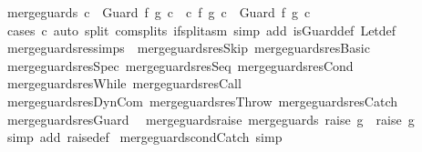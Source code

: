 \begin{isabellebody}
\ {\isachardoublequoteopen}merge{\isacharunderscore}guards\ c\ {\isacharequal}\ Guard\ f\ g\ c{\isacharprime}\ {\isasymLongrightarrow}\ {\isasymexists}c{\isacharprime}{\isacharprime}\ f{\isacharprime}\ g{\isacharprime}{\isachardot}\ c\ {\isacharequal}\ Guard\ f{\isacharprime}\ g{\isacharprime}\ c{\isacharprime}{\isacharprime}{\isachardoublequoteclose}\isanewline
%
\isadelimproof
\ \ %
\endisadelimproof
%
\isatagproof
{}\isamarkupfalse%
\ {\isacharparenleft}cases\ c{\isacharparenright}\ {\isacharparenleft}auto\ split{\isacharcolon}\ com{\isachardot}splits\ if{\isacharunderscore}split{\isacharunderscore}asm\ simp\ add{\isacharcolon}\ is{\isacharunderscore}Guard{\isacharunderscore}def\ Let{\isacharunderscore}def{\isacharparenright}%
\endisatagproof
{\isafoldproof}%
%
\isadelimproof
\isanewline
%
\endisadelimproof
\isanewline
{}\isamarkupfalse%
\ merge{\isacharunderscore}guards{\isacharunderscore}res{\isacharunderscore}simps\ {\isacharequal}\ merge{\isacharunderscore}guards{\isacharunderscore}res{\isacharunderscore}Skip\ merge{\isacharunderscore}guards{\isacharunderscore}res{\isacharunderscore}Basic\ \isanewline
\ merge{\isacharunderscore}guards{\isacharunderscore}res{\isacharunderscore}Spec\ merge{\isacharunderscore}guards{\isacharunderscore}res{\isacharunderscore}Seq\ merge{\isacharunderscore}guards{\isacharunderscore}res{\isacharunderscore}Cond\ \isanewline
\ merge{\isacharunderscore}guards{\isacharunderscore}res{\isacharunderscore}While\ merge{\isacharunderscore}guards{\isacharunderscore}res{\isacharunderscore}Call\isanewline
\ merge{\isacharunderscore}guards{\isacharunderscore}res{\isacharunderscore}DynCom\ merge{\isacharunderscore}guards{\isacharunderscore}res{\isacharunderscore}Throw\ merge{\isacharunderscore}guards{\isacharunderscore}res{\isacharunderscore}Catch\ \isanewline
\ merge{\isacharunderscore}guards{\isacharunderscore}res{\isacharunderscore}Guard\ \isanewline
\isanewline
{}\isamarkupfalse%
\ merge{\isacharunderscore}guards{\isacharunderscore}raise{\isacharcolon}\ {\isachardoublequoteopen}merge{\isacharunderscore}guards\ {\isacharparenleft}raise\ g{\isacharparenright}\ {\isacharequal}\ raise\ g{\isachardoublequoteclose}\isanewline
%
\isadelimproof
\ \ %
\endisadelimproof
%
\isatagproof
{}\isamarkupfalse%
\ {\isacharparenleft}simp\ add{\isacharcolon}\ raise{\isacharunderscore}def{\isacharparenright}%
\endisatagproof
{\isafoldproof}%
%
\isadelimproof
\isanewline
%
\endisadelimproof
\isanewline
{}\isamarkupfalse%
\ merge{\isacharunderscore}guards{\isacharunderscore}condCatch\ {\isacharbrackleft}simp{\isacharbrackright}{\isacharcolon}\isanewline

\end{isabellebody}
